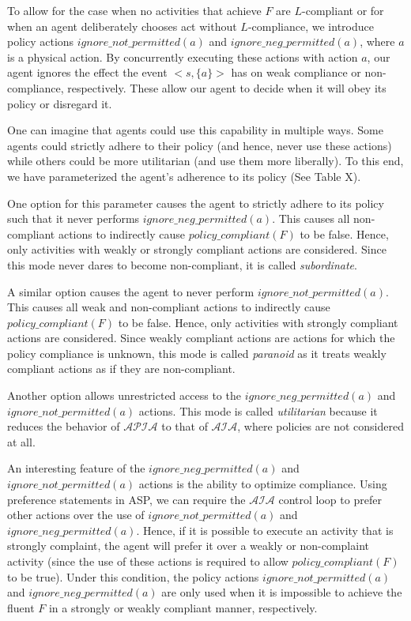 To allow for the case when no activities that achieve $F$ are $L$-compliant or for when an agent deliberately chooses act without $L$-compliance, we introduce policy actions $ignore\_not\_permitted(a)$ and $ignore\_neg\_permitted(a)$, where $a$ is a physical action.
By concurrently executing these actions with action $a$, our agent ignores the effect the event $<s, \{a\}>$ has on weak compliance or non-compliance, respectively.
These allow our agent to decide when it will obey its policy or disregard it.

One can imagine that agents could use this capability in multiple ways.
Some agents could strictly adhere to their policy (and hence, never use these actions) while others could be more utilitarian (and use them more liberally).
To this end, we have parameterized the agent's adherence to its policy (See Table X).

One option for this parameter causes the agent to strictly adhere to its policy such that it never performs $ignore\_neg\_permitted(a)$.
This causes all non-compliant actions to indirectly cause $policy\_compliant(F)$ to be false.
Hence, only activities with weakly or strongly compliant actions are considered.
Since this mode never dares to become non-compliant, it is called \textit{subordinate}.

A similar option causes the agent to never perform $ignore\_not\_permitted(a)$.
This causes all weak and non-compliant actions to indirectly cause $policy\_compliant(F)$ to be false.
Hence, only activities with strongly compliant actions are considered.
Since weakly compliant actions are actions for which the policy compliance is unknown, this mode is called \textit{paranoid} as it treats weakly compliant actions as if they are non-compliant.

Another option allows unrestricted access to the $ignore\_neg\_permitted(a)$ and $ignore\_not\_permitted(a)$ actions.
This mode is called \textit{utilitarian} because it reduces the behavior of $\mathcal{APIA}$ to that of $\mathcal{AIA}$, where policies are not considered at all.

An interesting feature of the $ignore\_neg\_permitted(a)$ and $ignore\_not\_permitted(a)$ actions is the ability to optimize compliance.
Using preference statements in ASP, we can require the $\mathcal{AIA}$ control loop to prefer other actions over the use of $ignore\_not\_permitted(a)$ and $ignore\_neg\_permitted(a)$.
Hence, if it is possible to execute an activity that is strongly complaint, the agent will prefer it over a weakly or non-complaint activity (since the use of these actions is required to allow $policy\_compliant(F)$ to be true).
Under this condition, the policy actions $ignore\_not\_permitted(a)$ and $ignore\_neg\_permitted(a)$ are only used when it is impossible to achieve the fluent $F$ in a strongly or weakly compliant manner, respectively.

